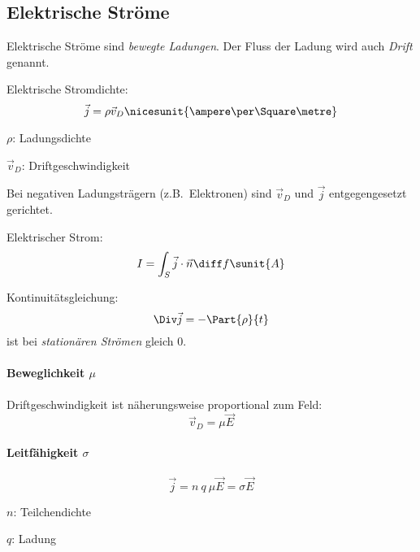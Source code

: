 	\subsection{Elektrische Ströme} %
		\begin{definition}
			Elektrische Ströme sind \emph{bewegte Ladungen}. Der Fluss der Ladung wird auch \emph{Drift} genannt.
		\end{definition}
		
		Elektrische Stromdichte:
		\begin{equation*}
			\vec j = \rho \vec v_D \nicesunit{\ampere\per\Square\metre}
		\end{equation*}
		\begin{tightitemize}
			\item[$\rho$:] Ladungsdichte
			\item[$\vec v_D$:] Driftgeschwindigkeit
		\end{tightitemize}
		\begin{bemerkung}
			Bei negativen Ladungsträgern (z.B.~Elektronen) sind $\vec v_D$ und $\vec j$ entgegengesetzt gerichtet.
		\end{bemerkung}
		
		Elektrischer Strom:
		\begin{equation*}
			I = \int_S \vec j \cdot \vec n \diff f \sunit{A}
		\end{equation*}
		
		Kontinuitätsgleichung:
		\begin{equation*}
			\Div \vec j = - \Part{\rho}{t}
		\end{equation*}
		ist bei \emph{stationären Strömen} gleich $0$.
		
		\paragraph{Beweglichkeit $\mu$} %
			Driftgeschwindigkeit ist näherungsweise proportional zum Feld:
			\begin{equation*}
				\vec v_D = \mu \vec E
			\end{equation*}
		
		\paragraph{Leitfähigkeit $\sigma$} %
			\begin{equation*}
				\vec j = n \: q \: \mu \vec E = \sigma \vec E
			\end{equation*}
			\begin{tightitemize}
				\item[$n$:] Teilchendichte
				\item[$q$:] Ladung
			\end{tightitemize}
		
